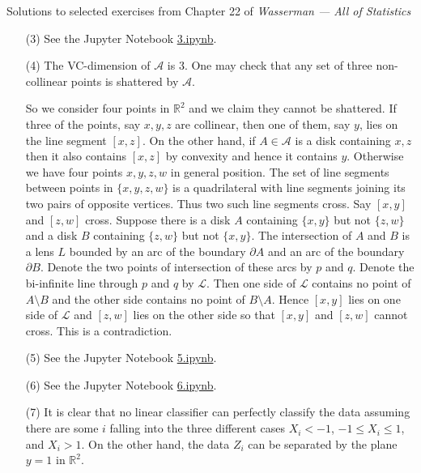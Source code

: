 \documentclass[10pt]{article}
\newcommand{\R}{\mathbb{R}}
\begin{document}
\noindent \large{Solutions to selected exercises from Chapter 22 of
\emph{Wasserman --- All of Statistics}}

\begin{enumerate}

\item[(3)]
See the Jupyter Notebook
\href{https://github.com/ajrasmus/some_of_statistics/blob/main/chapter_22/3.ipynb}{3.ipynb}.


\item[(4)]
The VC-dimension of $\mathcal A$ is 3. One may check that any set of
three non-collinear points is shattered by $\mathcal A$.

So we consider
four points in $\R^2$ and we claim they cannot be shattered. If three
of the points, say $x,y,z$ are collinear, then one of them, say $y$,
lies on the line segment $[x,z]$. On the other hand, if $A\in \mathcal A$
is a disk containing $x,z$ then it also contains $[x,z]$ by convexity
and hence it contains $y$. Otherwise we have four points $x,y,z,w$ in
general position. The set of line segments between points in $\{x,y,z,w\}$
is a quadrilateral with line segments joining its two pairs of opposite
vertices. Thus two such line segments cross. Say $[x,y]$ and $[z,w]$
cross. Suppose there is a disk $A$ containing $\{x,y\}$ but not $\{z,w\}$
and a disk $B$ containing $\{z,w\}$ but not $\{x,y\}$. The intersection of
$A$ and $B$ is a lens $L$ bounded by an arc of the boundary $\partial A$
and an arc of the boundary $\partial B$. Denote the two points of intersection
of these arcs by $p$ and $q$. Denote the bi-infinite line through $p$ and $q$
by $\mathcal L$. Then one side of $\mathcal L$ contains no point of
$A\setminus B$ and the other side contains no point of $B\setminus A$.
Hence $[x,y]$ lies on one side of $\mathcal L$ and $[z,w]$ lies on the other
side so that $[x,y]$ and $[z,w]$ cannot cross. This is a contradiction.

\item[(5)] See the Jupyter Notebook
\href{https://github.com/ajrasmus/some_of_statistics/blob/main/chapter_22/5.ipynb}{5.ipynb}.

\item[(6)] See the Jupyter Notebook
\href{https://github.com/ajrasmus/some_of_statistics/blob/main/chapter_22/6.ipynb}{6.ipynb}.

\item[(7)]
It is clear that no linear classifier can perfectly classify the data assuming
there are some $i$ falling into the three different cases
$X_i<-1$, $-1\leq X_i\leq 1$, and $X_i>1$. On the other hand,
the data $Z_i$ can be separated by the plane $y=1$ in $\R^2$.


\end{enumerate}
\end{document}
